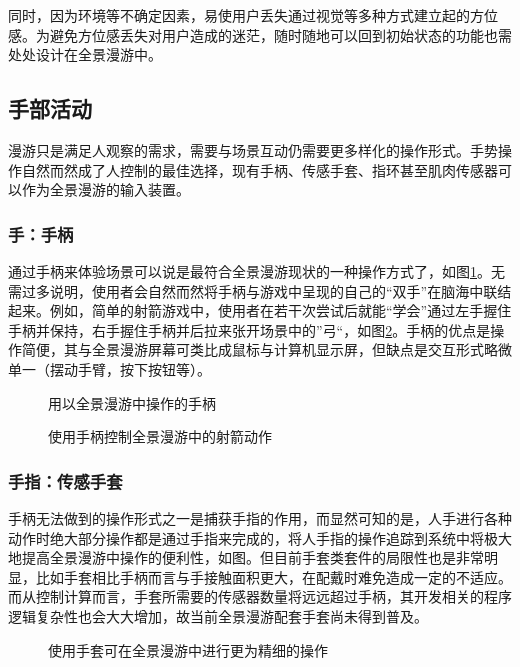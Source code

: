 同时，因为环境等不确定因素，易使用户丢失通过视觉等多种方式建立起的方位感。为避免方位感丢失对用户造成的迷茫，随时随地可以回到初始状态的功能也需处处设计在全景漫游中。

\subsection{手部活动}

漫游只是满足人观察的需求，需要与场景互动仍需要更多样化的操作形式。手势操作自然而然成了人控制的最佳选择，现有手柄、传感手套、指环甚至肌肉传感器可以作为全景漫游的输入装置。

\subsubsection{手：手柄}
通过手柄来体验场景可以说是最符合全景漫游现状的一种操作方式了，如图\ref{fig:handler}。无需过多说明，使用者会自然而然将手柄与游戏中呈现的自己的“双手”在脑海中联结起来。例如，简单的射箭游戏中，使用者在若干次尝试后就能“学会”通过左手握住手柄并保持，右手握住手柄并后拉来张开场景中的”弓“，如图\ref{fig:shoot}。手柄的优点是操作简便，其与全景漫游屏幕可类比成鼠标与计算机显示屏，但缺点是交互形式略微单一（摆动手臂，按下按钮等）。

\begin{figure}[htp]
\centering
{}
\caption{用以全景漫游中操作的手柄}
\label{fig:handler}
\end{figure}

\begin{figure}[htp]
\centering
{}
\caption{使用手柄控制全景漫游中的射箭动作}
\label{fig:shoot}
\end{figure}

\subsubsection{手指：传感手套}
手柄无法做到的操作形式之一是捕获手指的作用，而显然可知的是，人手进行各种动作时绝大部分操作都是通过手指来完成的，将人手指的操作追踪到系统中将极大地提高全景漫游中操作的便利性，如图。但目前手套类套件的局限性也是非常明显，比如手套相比手柄而言与手接触面积更大，在配戴时难免造成一定的不适应。而从控制计算而言，手套所需要的传感器数量将远远超过手柄，其开发相关的程序逻辑复杂性也会大大增加，故当前全景漫游配套手套尚未得到普及。

\begin{figure}[htp]
\centering
{}
\caption{使用手套可在全景漫游中进行更为精细的操作}
\label{fig:gloves}
\end{figure}

